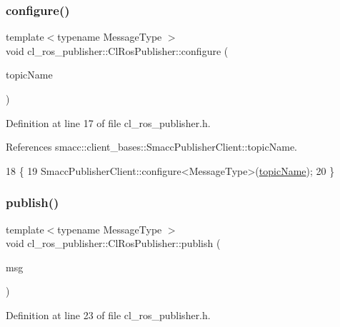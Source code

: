 \subsubsection{\texorpdfstring{configure()}{configure()}}
{\footnotesize\ttfamily template$<$typename Message\+Type $>$ \\
void cl\+\_\+ros\+\_\+publisher\+::\+Cl\+Ros\+Publisher\+::configure (\begin{DoxyParamCaption}\item[{std\+::string}]{topic\+Name }\end{DoxyParamCaption})\hspace{0.3cm}{\ttfamily [inline]}}



Definition at line 17 of file cl\+\_\+ros\+\_\+publisher.\+h.



References smacc\+::client\+\_\+bases\+::\+Smacc\+Publisher\+Client\+::topic\+Name.


\begin{DoxyCode}
18     \{
19         SmaccPublisherClient::configure<MessageType>(\hyperlink{classsmacc_1_1client__bases_1_1SmaccPublisherClient_a8b8d98aef9b3b3a441005d2cb17b4fcc}{topicName});
20     \}
\end{DoxyCode}
\mbox{\label{classcl__ros__publisher_1_1ClRosPublisher_a3517d62fb0703a0a72efe6de7ad1a6d8}} 
\subsubsection{\texorpdfstring{publish()}{publish()}}
{\footnotesize\ttfamily template$<$typename Message\+Type $>$ \\
void cl\+\_\+ros\+\_\+publisher\+::\+Cl\+Ros\+Publisher\+::publish (\begin{DoxyParamCaption}\item[{const Message\+Type \&}]{msg }\end{DoxyParamCaption})\hspace{0.3cm}{\ttfamily [inline]}}



Definition at line 23 of file cl\+\_\+ros\+\_\+publisher.\+h.



